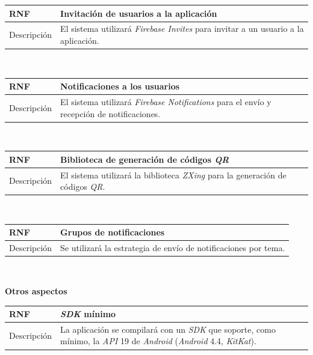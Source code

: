 \documentclass[twoside]{report}
\newcommand\addrow[2]{#1 &#2\\ }
\newcommand\addheading[2]{#1 &#2\\ \hline}
\newcommand\tabularhead{\begin{tabular}{lp{0.7\textwidth}}
\hline
}
\newenvironment{req}{\tabularhead}
{\hline\end{tabular}}
\begin{document}
\vspace{0.25cm}

\begin{req}
	\addheading{\textbf{RNF\arabic{nonFunctionalRequirements}}}{Invitación de usuarios a la aplicación}
	\addrow{Descripción}{El sistema utilizará \textit{Firebase Invites} para invitar a un usuario a la aplicación.}
\end{req}\\

\vspace{0.25cm}

\begin{req}
	\addheading{\textbf{RNF\arabic{nonFunctionalRequirements}}}{Notificaciones a los usuarios}
	\addrow{Descripción}{El sistema utilizará \textit{Firebase Notifications} para el envío y recepción de notificaciones.}
\end{req}\\

\vspace{0.25cm}

\begin{req}
	\addheading{\textbf{RNF\arabic{nonFunctionalRequirements}}}{Biblioteca de generación de códigos \textit{QR}}
	\addrow{Descripción}{El sistema utilizará la biblioteca \textit{ZXing} para la generación de códigos \textit{QR}.}
\end{req}\\

\vspace{0.25cm}

\begin{req}
	\addheading{\textbf{RNF\arabic{nonFunctionalRequirements}}}{Grupos de notificaciones}
	\addrow{Descripción}{Se utilizará la estrategia de envío de notificaciones por tema.}
\end{req}\\

\vspace{1cm}

\textbf{Otros aspectos}\\

\begin{req}
	\addheading{\textbf{RNF\arabic{nonFunctionalRequirements}}}{\textit{SDK} mínimo}
	\addrow{Descripción}{La aplicación se compilará con un \textit{SDK} que soporte, como mínimo, la \textit{API} 19 de \textit{Android} (\textit{Android} 4.4, \textit{KitKat})\cite{androidversiondist}.}
\end{req}\\
\end{document}
